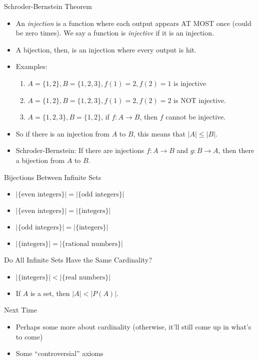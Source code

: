 \documentclass{beamer}
\begin{document}
\begin{frame}{Schroder-Bernstein Theorem}
\begin{itemize}
\item An \emph{injection} is a function where each output appears AT MOST once (could be zero times). We say a function is \emph{injective} if it is an injection.
\item A bijection, then, is an injection where every output is hit.
\item Examples:
\begin{enumerate}
\item $A = \{1,2\}, B = \{1,2,3\}, f(1)=2, f(2)=1$ is injective
\item $A = \{1,2\}, B = \{1,2,3\}, f(1)=2, f(2)=2$ is NOT injective.
\item $A = \{1,2,3\}, B = \{1,2\}$, if $f:A\to B$, then $f$ cannot be injective.
\end{enumerate}
\item So if there is an injection from $A$ to $B$, this means that $|A|\le |B|$.
\item Schroder-Bernstein: If there are injections $f:A\to B$ and $g:B\to A$, then there a bijection from $A$ to $B$.
\end{itemize}
\end{frame}

\begin{frame}{Bijections Between Infinite Sets}
\begin{itemize}
\item $|\{\text{even integers}\}| = |\{\text{odd integers}\}|$
\item $|\{\text{even integers}\}| = |\{\text{integers}\}|$
\item $|\{\text{odd integers}\}| = |\{\text{integers}\}|$
\item $|\{\text{integers}\}| = |\{\text{rational numbers}\}|$
\end{itemize}
\end{frame}

\begin{frame}{Do All Infinite Sets Have the Same Cardinality?}
\begin{itemize}
\item $|\{\text{integers}\}| < |\{\text{real numbers}\}|$
\item If $A$ is a set, then $|A|<|P(A)|$.
\end{itemize}
\end{frame}

\begin{frame}{Next Time}
\begin{itemize}
\item Perhaps some more about cardinality (otherwise, it'll still come up in what's to come)
\item Some ``controversial'' axioms
\end{itemize}
\end{frame}
\end{document}
